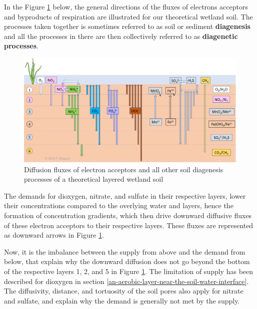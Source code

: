 \documentclass[]{book}
\theoremstyle{definition}
\theoremstyle{definition}
\theoremstyle{definition}
\theoremstyle{remark}
\begin{document}
In the Figure \ref{fig:diagenesis-diffusion-directions} below, the
general directions of the fluxes of electrons acceptors and byproducts
of respiration are illustrated for our theoretical wetland soil. The
processes taken together is sometimes referred to as soil or sediment
\textbf{diagenesis} and all the processes in there are then collectively
referred to as \textbf{diagenetic processes}.

\begin{figure}

{\centering \includegraphics[width=1\linewidth]{pictures/diagenesis-diffusion-directions} 

}

\caption{Diffusion fluxes of electron acceptors and all other soil diagenesis processes of a theoretical layered wetland soil}\label{fig:diagenesis-diffusion-directions}
\end{figure}

The demands for dioxygen, nitrate, and sulfate in their respective
layers, lower their concentrations compared to the overlying water and
layers, hence the formation of concentration gradients, which then drive
downward diffusive fluxes of these electron acceptors to their
respective layers. These fluxes are represented as downward arrows in
Figure \ref{fig:diagenesis-diffusion-directions}.

Now, it is the imbalance between the supply from above and the demand
from below, that explain why the downward diffusion does not go beyond
the bottom of the respective layers 1, 2, and 5 in Figure
\ref{fig:diagenesis-diffusion-directions}. The limitation of supply has
been described for dioxygen in section
\ref{an-aerobic-layer-near-the-soil-water-interface}. The diffusivity,
distance, and tortuosity of the soil pores also apply for nitrate and
sulfate, and explain why the demand is generally not met by the supply.
\end{document}
